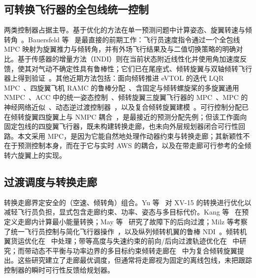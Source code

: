 \documentclass[UTF8,a4paper,11pt]{ctexart}
\begin{document}
\subsection{可转换飞行器的全包线统一控制}
两类控制器占据主导。基于优化的方法在单一预测问题中计算姿态、旋翼转速与倾转角~\cite{bauersfeld2021mpc,allenspach2021nmpc,rohr2021nmpc,chen2024unified}。Bauersfeld 等~\cite{bauersfeld2021mpc} 是最直接的前期工作：飞行员速度指令通过一个全包线 MPC 映射为旋翼推力与倾转角，并有外场飞行结果及与二值切换策略的明确对比。基于传感器的增量方法（INDI）则在当前状态附近线性化并使用角加速度反馈，使其对气动不确定性具有鲁棒性；它们已在尾座式、倾转旋翼与双轴倾转飞行器上得到验证~\cite{smeur2020incremental,smeur2018cascaded,smeur2016adaptive,wang2019stability,mancinelli2025unified,bhardwaj2018integrated,lovell2023tailsitter,sun2021incremental}。其他近期方法包括：面向倾转推进 eVTOL 的迭代 LQR MPC~\cite{xia2022ilqr}、四旋翼飞机 RAMC 的鲁棒分配~\cite{cardoso2020ramc}、含固定与倾转螺旋桨的多旋翼通用 NMPC~\cite{bicego2020nmpc}、ACC 中的统一姿态控制~\cite{belak2023unified}、倾转旋翼三旋翼飞行器的 MPC~\cite{prach2018mpc}、MPC 的神经网络近似~\cite{ducard2024neural,jiang2022nnmpc}、动态逆过渡控制器~\cite{saetti2025dynamic,jeong2025longitudinal,li2026asynchronous}，以及复合倾转旋翼建模~\cite{liang2024composite}。可行控制分配已在倾转旋翼四旋翼上与 NMPC 耦合~\cite{shayan2024nmpc}，是最接近的预测分配先例；但该工作面向固定包线的四旋翼飞行器，既未构建转换走廊，也未向外层规划器闭合可行性回路。本文采用 MPC，是因为它能自然地处理作动器约束与转换走廊；其新颖性不在于预测控制本身，而在于它与实时 AWS 的耦合，以及在带走廊可行参考的全倾转六旋翼上的实现。

\subsection{过渡调度与转换走廊}
转换走廊界定安全的（空速、倾转角）组合。Yu 等~\cite{yu2022pilot} 对 XV-15 的转换进行优化以减轻飞行员负担，显式包含走廊约束、功率、姿态与多目标代价。Kang 等~\cite{kang2024minimum} 在预定义走廊内计算最小能量转换；May 等~\cite{may2025backward} 研究了故障下的后向过渡；Milz 等考察了统一飞行员控制与简化飞行器操作~\cite{milz2026taming}，以及纵列倾转机翼的鲁棒 NDI~\cite{milz2024tandem}。倾转机翼货运优化在~\cite{chen2020tiltwing} 中处理；带等高度与失速约束的前向/后向过渡轨迹优化在~\cite{panish2024tiltwing} 中研究；而带动态不平衡与功率边界的多目标约束倾转走廊在~\cite{zhuang2025mctc} 中为复合倾转旋翼提出。这些研究建立了走廊最优调度，但通常将走廊视为固定的离线包线，未把跟踪控制器的瞬时可行性反馈给规划器。
\end{document}
